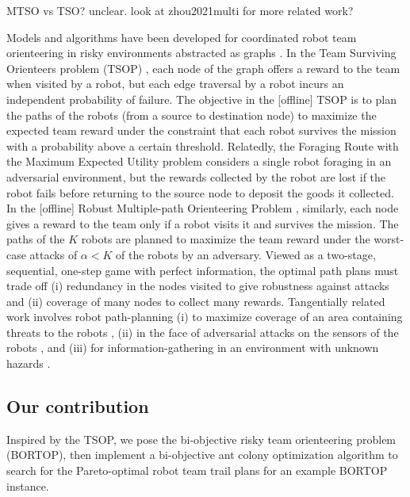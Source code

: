 \documentclass[11pt, oneside]{article}
\begin{document}
{\color{red} MTSO vs TSO? unclear. look at zhou2021multi for more related work?}

Models and algorithms have been developed for coordinated robot team orienteering in risky environments abstracted as graphs \cite{zhou2021multi}. 
In the Team Surviving Orienteers problem (TSOP) \cite{jorgensen2018team,jorgensen2017matroid,jorgensen2024matroid}, each node of the graph offers a reward to the team when visited by a robot, but each edge traversal by a robot incurs an independent probability of failure. The objective in the [offline] TSOP is to plan the paths of the robots (from a source to destination node) to maximize the expected team reward under the constraint that each robot survives the mission with a probability above a certain threshold. 
Relatedly, the Foraging Route with the Maximum Expected Utility problem \cite{di2022foraging} considers a single robot foraging in an adversarial environment, but the rewards collected by the robot are lost if the robot fails before returning to the source node to deposit the goods it collected.
In the [offline] Robust Multiple-path Orienteering Problem \cite{shi2023robust}, similarly, each node gives a reward to the team only if a robot visits it and survives the mission. The paths of the $K$ robots are planned to maximize the team reward under the worst-case attacks of $\alpha<K$ of the robots by an adversary. 
Viewed as a two-stage, sequential, one-step game with perfect information, the optimal path plans must trade off (i) redundancy in the nodes visited to give robustness against attacks and (ii) coverage of many nodes to collect many rewards.
Tangentially related work involves robot path-planning (i) to maximize coverage of an area containing threats to the robots \cite{korngut2023multi,yehoshua2016robotic}, (ii) in the face of adversarial attacks on the sensors of the robots \cite{liu2021distributed,zhou2022distributed,mayya2022adaptive,zhou2018resilient}, and (iii) for information-gathering in an environment with unknown hazards \cite{schwager2017multi}.

\subsection{Our contribution}
Inspired by the TSOP, we pose the bi-objective risky team orienteering problem (BORTOP), then implement a bi-objective ant colony optimization algorithm to search for the Pareto-optimal robot team trail plans for an example BORTOP instance.
\end{document}
